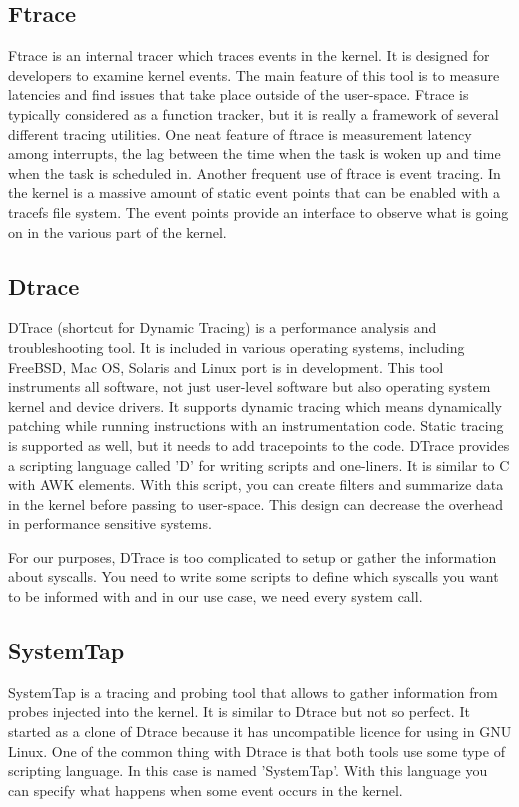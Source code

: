 \subsection{Ftrace}
Ftrace\cite{ftrace_man} is an internal tracer which traces events in the kernel.
It is designed for developers to examine kernel events.
The main feature of this tool is to measure latencies and find issues that take place outside of the user-space.
Ftrace is typically considered as a function tracker,
but it is really a framework of several different tracing utilities.
One neat feature of ftrace is measurement latency among interrupts, the lag between the time when the task is woken up and time when the task is scheduled in.
Another frequent use of ftrace is event tracing.
In the kernel is a massive amount of static event points that can be enabled with a tracefs file system.
The event points provide an interface to observe what is going on in the various part of the kernel.

\subsection{Dtrace}
DTrace\cite{dtrace_man}\cite{dtrace_about} (shortcut for Dynamic Tracing) is a performance analysis and troubleshooting tool.
It is included in various operating systems, including FreeBSD, Mac OS, Solaris and Linux port is in development.
This tool instruments all software, not just user-level software but also operating system kernel and device drivers.
It supports dynamic tracing which means dynamically patching while running instructions with an instrumentation code.
Static tracing is supported as well, but it needs to add tracepoints to the code.
DTrace provides a scripting language called 'D' for writing scripts and one-liners.
It is similar to C with AWK elements.
With this script, you can create filters and summarize data in the kernel before passing to user-space.
This design can decrease the overhead in performance sensitive systems.

For our purposes, DTrace is too complicated to setup or gather the information about syscalls.
You need to write some scripts to define which syscalls you want to be informed with and in our use case, we need every system call.

\subsection{SystemTap}
SystemTap\cite{systemtap} is a tracing and probing tool that allows to gather information from probes injected into the kernel.
It is similar to Dtrace but not so perfect.
It started as a clone of Dtrace because it has uncompatible licence for using in GNU Linux.
One of the common thing with Dtrace is that both tools use some type of scripting language.
In this case is named 'SystemTap'.
With this language you can specify what happens when some event occurs in the kernel.

